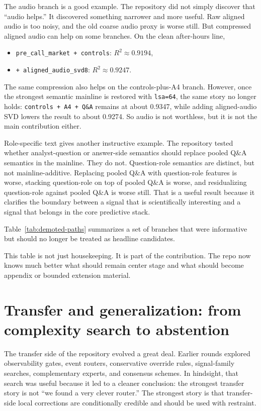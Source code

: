 \documentclass[acmsmall,screen,nonacm]{acmart}
\begin{document}
The audio branch is a good example. The repository did not simply discover that ``audio helps.'' It discovered something narrower and more useful. Raw aligned audio is too noisy, and the old coarse audio proxy is worse still. But compressed aligned audio can help on some branches. On the clean after-hours line,
\begin{itemize}[leftmargin=1.5em]
    \item \texttt{pre\_call\_market + controls}: $R^2 \approx 0.9194$,
    \item \texttt{+ aligned\_audio\_svd8}: $R^2 \approx 0.9247$.
\end{itemize}
The same compression also helps on the controls-plus-A4 branch. However, once the strongest semantic mainline is restored with \texttt{lsa=64}, the same story no longer holds: \texttt{controls + A4 + Q\&A} remains at about 0.9347, while adding aligned-audio SVD lowers the result to about 0.9274. So audio is not worthless, but it is not the main contribution either.

Role-specific text gives another instructive example. The repository tested whether analyst-question or answer-side semantics should replace pooled Q\&A semantics in the mainline. They do not. Question-role semantics are distinct, but not mainline-additive. Replacing pooled Q\&A with question-role features is worse, stacking question-role on top of pooled Q\&A is worse, and residualizing question-role against pooled Q\&A is worse still. That is a useful result because it clarifies the boundary between a signal that is scientifically interesting and a signal that belongs in the core predictive stack.

Table~\ref{tab:demoted-paths} summarizes a set of branches that were informative but should no longer be treated as headline candidates.



This table is not just housekeeping. It is part of the contribution. The repo now knows much better what should remain center stage and what should become appendix or bounded extension material.

\section{Transfer and generalization: from complexity search to abstention}
The transfer side of the repository evolved a great deal. Earlier rounds explored observability gates, event routers, conservative override rules, signal-family searches, complementary experts, and consensus schemes. In hindsight, that search was useful because it led to a cleaner conclusion: the strongest transfer story is not ``we found a very clever router.'' The strongest story is that transfer-side local corrections are conditionally credible and should be used with restraint.
\end{document}

